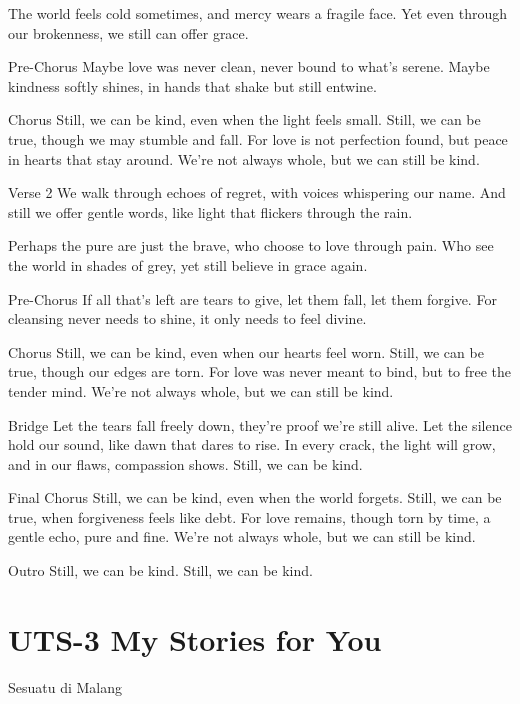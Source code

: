 \documentclass[
  letterpaper,
  DIV=11,
  numbers=noendperiod]{scrreprt}
\begin{document}
The world feels cold sometimes, and mercy wears a fragile face. Yet even
through our brokenness, we still can offer grace.

Pre-Chorus Maybe love was never clean, never bound to what's serene.
Maybe kindness softly shines, in hands that shake but still entwine.

Chorus Still, we can be kind, even when the light feels small. Still, we
can be true, though we may stumble and fall. For love is not perfection
found, but peace in hearts that stay around. We're not always whole, but
we can still be kind.

Verse 2 We walk through echoes of regret, with voices whispering our
name. And still we offer gentle words, like light that flickers through
the rain.

Perhaps the pure are just the brave, who choose to love through pain.
Who see the world in shades of grey, yet still believe in grace again.

Pre-Chorus If all that's left are tears to give, let them fall, let them
forgive. For cleansing never needs to shine, it only needs to feel
divine.

Chorus Still, we can be kind, even when our hearts feel worn. Still, we
can be true, though our edges are torn. For love was never meant to
bind, but to free the tender mind. We're not always whole, but we can
still be kind.

Bridge Let the tears fall freely down, they're proof we're still alive.
Let the silence hold our sound, like dawn that dares to rise. In every
crack, the light will grow, and in our flaws, compassion shows. Still,
we can be kind.

Final Chorus Still, we can be kind, even when the world forgets. Still,
we can be true, when forgiveness feels like debt. For love remains,
though torn by time, a gentle echo, pure and fine. We're not always
whole, but we can still be kind.

Outro Still, we can be kind. Still, we can be kind.


\chapter{UTS-3 My Stories for You}\label{uts-3-my-stories-for-you}

Sesuatu di Malang
\end{document}

